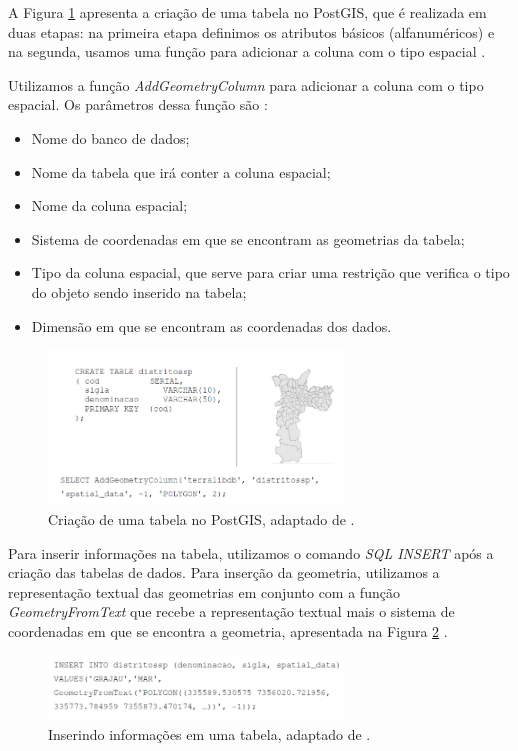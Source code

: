 A Figura \ref{fig:CreatePostGIS} apresenta a criação de uma tabela no PostGIS, que é realizada em duas etapas: na primeira etapa definimos os atributos básicos (alfanuméricos) e na segunda, usamos uma função para adicionar a coluna com o tipo espacial \cite{queirozferreira}.

Utilizamos a função \textit{AddGeometryColumn} para adicionar a coluna com o tipo espacial. Os parâmetros dessa função são \cite{queirozferreira}:

\begin{itemize}
\item Nome do banco de dados;
\item Nome da tabela que irá conter a coluna espacial;
\item Nome da coluna espacial;
\item Sistema de coordenadas em que se encontram as geometrias da tabela;
\item Tipo da coluna espacial, que serve para criar uma restrição que verifica o tipo do objeto sendo inserido na tabela;
\item Dimensão em que se encontram as coordenadas dos dados.
\end{itemize}

\begin{figure}[h]
\centering
\includegraphics[width=0.70\textwidth]{./img/cap_II/12-CreatePostGIS}
\caption{Criação de uma tabela no PostGIS, adaptado de \cite{queirozferreira}.}
\label{fig:CreatePostGIS}
\end{figure}

Para inserir informações na tabela, utilizamos o comando \textit{SQL INSERT} após a criação das tabelas de dados. Para inserção da geometria, utilizamos a representação textual das geometrias em conjunto com a função \textit{GeometryFromText} que recebe a representação textual mais o sistema de coordenadas em que se encontra a geometria, apresentada na Figura \ref{fig:InsertPostGIS} \cite{queirozferreira}.

\begin{figure}[h]
\centering
\includegraphics[width=0.70\textwidth]{./img/cap_II/13-InsertPostGIS}
\caption{Inserindo informações em uma tabela, adaptado de \cite{queirozferreira}.}
\label{fig:InsertPostGIS}
\end{figure}

